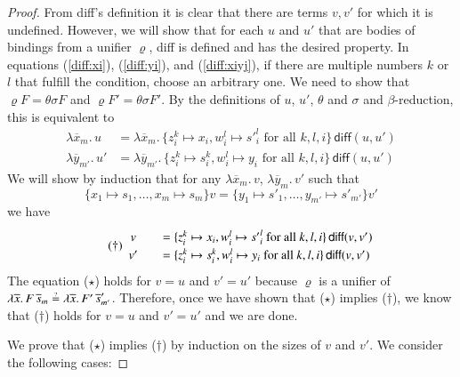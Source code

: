 \begin{proof}
  From \textsf{diff}'s definition it is clear that there are terms $v,v'$ for which it is undefined.
  However, we will show that for each $u$ and $u'$ that are bodies of bindings from a unifier $\varrho$, 
  \textsf{diff} is defined and has the desired property.
  In equations (\ref{diff:xi}), (\ref{diff:yi}), and (\ref{diff:xiyj}), if there are multiple numbers $k$ or $l$
  that fulfill the condition, choose an arbitrary one.
  We need to show that $\varrho F = \theta\sigma F$ and $\varrho F' = \theta\sigma F'$.
  By the definitions of $u$, $u'$, $\theta$ and $\sigma$ and $\beta$-reduction, this is equivalent to
  \begin{align*}
    \lambda \overline{x}_m.\, u &= \lambda \overline{x}_m.\,
    \{z_i^k \mapsto x_i, w_i^l \mapsto {s'}_i^l \text{ for all }k,l,i\}\,\textsf{diff}(u,u')\\
    \lambda \overline{y}_{m'}.\, u' &= \lambda \overline{y}_{m'}.\,
    \{z_i^k \mapsto s_i^k, w_i^l \mapsto y_i \text{ for all }k,l,i\}\,\textsf{diff}(u,u')
  \end{align*}
  We will show by induction that for any $\lambda \overline{x}_m.\, v$, $\lambda \overline{y}_m.\, v'$ such that 
  \[\{x_1 \mapsto s_1, \ldots, x_m \mapsto  s_m\} v = \{y_1 \mapsto s'_1, \ldots, y_{m'} \mapsto  s'_{m'}\} v' \tag{$\star$}\]
  we have
  \begin{align*}
    \tag{\textdagger}
    \renewcommand{\arraystretch}{1.2}%
    \begin{array}{c@{\qquad}l}
      v &=
      \{z_i^k \mapsto x_i, w_i^l \mapsto {s'}_i^l \text{ for all }k,l,i\}\,\textsf{diff}(v,v')\\
      v' &=
      \{z_i^k \mapsto s_i^k, w_i^l \mapsto y_i \text{ for all }k,l,i\}\,\textsf{diff}(v,v')
    \end{array}
  \end{align*}
  The equation ($\star$) holds for $v = u$ and $v' = u'$ because
  $\varrho$ is a unifier of
  $\lambda
  \overline{x}.\, F \, \overline{s}_m \unif \lambda\overline{x}.\, F' \,
  \overline{s}'_{m'}$.
  Therefore, once we have shown that ($\star$) implies ($\dagger$),
  we know that ($\dagger$) holds for $v = u$ and $v' = u'$ and we are done.
  
  We prove that ($\star$) implies ($\dagger$) by induction on the sizes of $v$ and $v'$. We consider
  the following cases: 


\end{proof}
